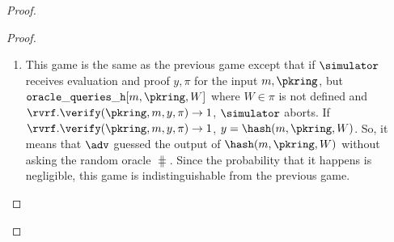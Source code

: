 \begin{proof}
\begin{proof}
\begin{enumerate}[label={{Game} }{{\arabic*}}, start = 0]
%						
%						
%					
%						
%						
%						
%						
%						
%						
%						
%						
%						
%						
%						
%						
%		
			
			\item This game is the same as the previous game except that if $ \simulator $ receives evaluation and proof $ y, \pi $ for the input $ m, \pkring $, but $ \mathtt{oracle\_queries\_h}[m, \pkring, W] $ where $ W \in \pi $ is not defined and $ \rvrf.\verify(\pkring, m, y, \pi) \rightarrow 1$, $ \simulator $ aborts. If $ \rvrf.\verify(\pkring, m, y, \pi) \rightarrow 1$,  $ y = \hash(m, \pkring,W) $. So, it means that $ \adv $ guessed the output of $ \hash(m, \pkring,W) $ without asking the random oracle $ \hash $. Since the probability that it happens is negligible, this game is indistinguishable from the previous game.
			

\end{enumerate}
\end{proof}
\end{proof}
